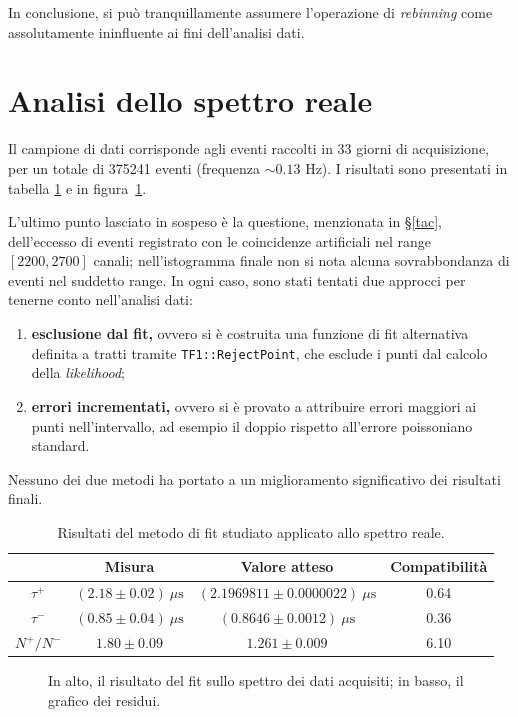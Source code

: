 \documentclass[10pt, oneside, a4paper]{article}   	%
\begin{document}
In conclusione, si può tranquillamente assumere l'operazione di \textit{rebinning} come assolutamente ininfluente ai fini dell'analisi dati.
%
\section{Analisi dello spettro reale} \label{analisireale}
Il campione di dati corrisponde agli eventi raccolti in 33 giorni di acquisizione, per un totale di 375241 eventi (frequenza $\sim0.13$ Hz). I risultati sono presentati in tabella \ref{risultatiFinali} e in figura~\ref{fig:finale}.

L'ultimo punto lasciato in sospeso è la questione, menzionata in \S\ref{tac}, dell'eccesso di eventi registrato con le coincidenze artificiali nel range $[2200,2700]$ canali; nell'istogramma finale non si nota alcuna sovrabbondanza di eventi nel suddetto range. In ogni caso, sono stati tentati due approcci per tenerne conto nell'analisi dati:
\begin{enumerate}
  \item \textbf{esclusione dal fit,} ovvero si è costruita una funzione di fit alternativa definita a tratti tramite \lstinline{TF1::RejectPoint}, che esclude i punti dal calcolo della \textit{likelihood};
  \item \textbf{errori incrementati,} ovvero si è provato a attribuire errori maggiori ai punti nell'intervallo, ad esempio il doppio rispetto all'errore poissoniano standard.
\end{enumerate}
Nessuno dei due metodi ha portato a un miglioramento significativo dei risultati finali.
%
\begin{table}[H]
	\centering
	\begin{tabular}{cccc}
		\toprule
				& Misura	& Valore atteso 	& Compatibilità \\	
		\midrule
		$\tau^+$	& $(2.18 \pm 0.02) \ \mu \mbox{s}$ 	& $(2.1969811 \pm 0.0000022) \  \mu \mbox{s}$ 	& 0.64 	\\
		$\tau^-$	& $(0.85 \pm 0.04)  \ \mu \mbox{s}$ 	& $(0.8646 \pm 0.0012)  \ \mu \mbox{s}$ 		& 0.36	\\
		$N^+/N^-$	& $1.80 \pm 0.09$ 	& $1.261 \pm 0.009$ 		& 6.10	\\
		\bottomrule
	\end{tabular}
	\caption{Risultati del metodo di fit studiato applicato allo spettro reale.}
	\label{risultatiFinali}
\end{table}
%
\begin{figure}[H]
 \centerline{%
  }
  \caption{In alto, il risultato del fit sullo spettro dei dati acquisiti; in basso, il grafico dei residui.}
  \label{fig:finale}
\end{figure}
%
\end{document}
